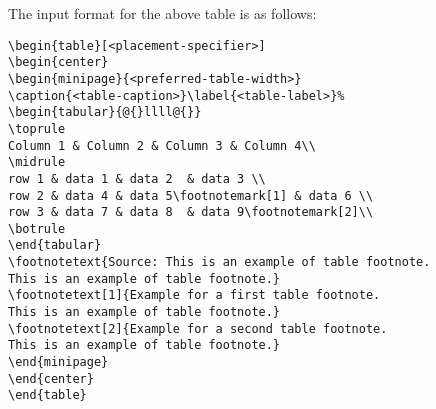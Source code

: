 \documentclass[sn-standardnature]{sn-jnl}%
\theoremstyle{thmstyleone}%
\theoremstyle{thmstyletwo}%
\theoremstyle{thmstylethree}%
\begin{document}
\noindent
The input format for the above table is as follows:

\bigskip
\begin{verbatim}
\begin{table}[<placement-specifier>]
\begin{center}
\begin{minipage}{<preferred-table-width>}
\caption{<table-caption>}\label{<table-label>}%
\begin{tabular}{@{}llll@{}}
\toprule
Column 1 & Column 2 & Column 3 & Column 4\\
\midrule
row 1 & data 1 & data 2	 & data 3 \\
row 2 & data 4 & data 5\footnotemark[1] & data 6 \\
row 3 & data 7 & data 8	 & data 9\footnotemark[2]\\
\botrule
\end{tabular}
\footnotetext{Source: This is an example of table footnote.
This is an example of table footnote.}
\footnotetext[1]{Example for a first table footnote.
This is an example of table footnote.}
\footnotetext[2]{Example for a second table footnote.
This is an example of table footnote.}
\end{minipage}
\end{center}
\end{table}
\end{verbatim}
\bigskip
\end{document}
